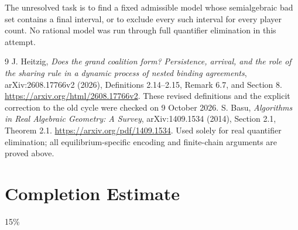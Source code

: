 \documentclass[11pt]{article}
\theoremstyle{definition}
\begin{document}
The unresolved task is to find a fixed admissible model whose semialgebraic bad set contains a final interval, or to exclude every such interval for every player count. No rational model was run through full quantifier elimination in this attempt.

\begin{thebibliography}{9}
 J. Heitzig, \emph{Does the grand coalition form? Persistence, arrival, and the role of the sharing rule in a dynamic process of nested binding agreements}, arXiv:2608.17766v2 (2026), Definitions 2.14--2.15, Remark 6.7, and Section 8. \url{https://arxiv.org/html/2608.17766v2}. These revised definitions and the explicit correction to the old cycle were checked on 9 October 2026.
 S. Basu, \emph{Algorithms in Real Algebraic Geometry: A Survey}, arXiv:1409.1534 (2014), Section 2.1, Theorem 2.1. \url{https://arxiv.org/pdf/1409.1534}. Used solely for real quantifier elimination; all equilibrium-specific encoding and finite-chain arguments are proved above.
\end{thebibliography}

\section{Completion Estimate}
15\%
\end{document}
